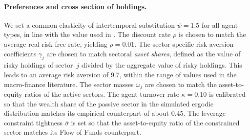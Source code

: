 \documentclass[12pt,english]{article}
\begin{document}
\paragraph{Preferences and cross section of holdings.}
We set a common elasticity of intertemporal substitution $\psi=1.5$ for all agent types, in line with the value used in \citet{bansal2004risks}.
The discount rate $\rho$ is chosen to match the average real risk-free rate, yielding $\rho=0.01$.
The sector-specific risk aversion coefficients $\gamma_j$ are chosen to match sectoral \emph{asset shares}, defined as the value of risky holdings of sector~$j$ divided by the aggregate value of risky holdings.
This leads to an average risk aversion of 9.7, within the range of values used in the macro-finance literature.
The sector masses $\omega_j$ are chosen to match the asset-to-equity ratios of the active sectors.
The agent turnover rate $\kappa=0.10$ is calibrated so that the wealth share of the passive sector in the simulated ergodic distribution matches its empirical counterpart of about $0.45$.
The leverage constraint tightness $\overline{\sigma}$ is set so that the asset-to-equity ratio of the constrained sector matches its Flow of Funds counterpart.
\end{document}
